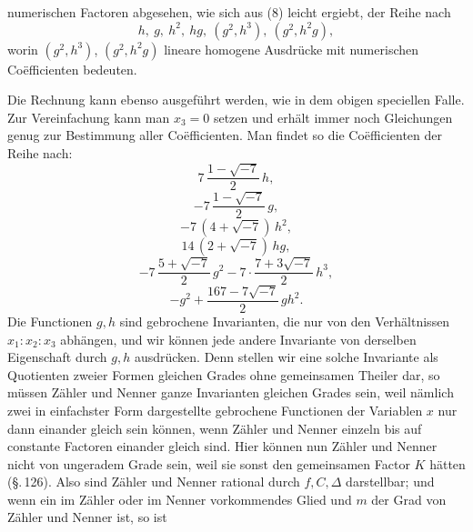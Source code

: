 
numerischen Factoren abgesehen, wie sich aus (8) leicht ergiebt,
der Reihe nach
\[
h,\ g,\ h^2,\ hg,\ (g^2,h^3),\ (g^2,h^2g),
\]
worin $(g^2,h^3)$, $(g^2,h^2g)$ lineare homogene Ausdr\"ucke mit numeri\-schen
Co\"efficienten bedeuten.

Die Rechnung kann ebenso ausgef\"uhrt werden, wie in dem
obigen speciellen Falle. Zur Vereinfachung kann man $x_3=0$
setzen und erh\"alt immer noch Gleichungen genug zur Be\-stimmung
aller Co\"efficienten. Man findet so die Co\"efficienten
der Reihe nach:
\[
7\,\frac{1-\sqrt{-7}}{2}\,h,
\]
\[
-7\,\frac{1-\sqrt{-7}}{2}\,g,
\]
\[
-7\,(4+\sqrt{-7})\,h^2,
\]
\[
14\,(2+\sqrt{-7})\,hg,
\]
\[
-7\,\frac{5+\sqrt{-7}}{2}\,g^2 - 7\cdot\frac{7+3\sqrt{-7}}{2}\,h^3,
\]
\[
-g^2 + \frac{167-7\sqrt{-7}}{2}\,gh^2.
\]
Die Functionen $g, h$ sind gebrochene Invarianten, die nur
von den Verh\"altnissen $x_1:x_2:x_3$ abh\"angen, und wir k\"onnen
jede andere Invariante von derselben Eigenschaft
 durch $g, h$ ausdr\"ucken. Denn stellen wir eine
solche Invariante als Quotienten zweier Formen gleichen Grades
ohne gemeinsamen Theiler dar, so m\"ussen Z\"ahler und Nenner
ganze Invarianten gleichen Grades sein, weil n\"amlich zwei in
einfachster Form dargestellte gebrochene Functionen der
Variablen $x$ nur dann einander gleich sein k\"onnen, wenn Z\"ahler
und Nenner einzeln bis auf constante Factoren einander gleich
sind. Hier k\"onnen nun Z\"ahler und Nenner nicht von ungeradem
Grade sein, weil sie sonst den gemeinsamen Factor $K$ h\"atten
(\S.\,126). Also sind Z\"ahler und Nenner rational durch $f, C, \Delta$
darstellbar; und wenn ein im Z\"ahler oder im Nenner vorkommendes
Glied
und $m$ der Grad von Z\"ahler und Nenner ist, so ist
